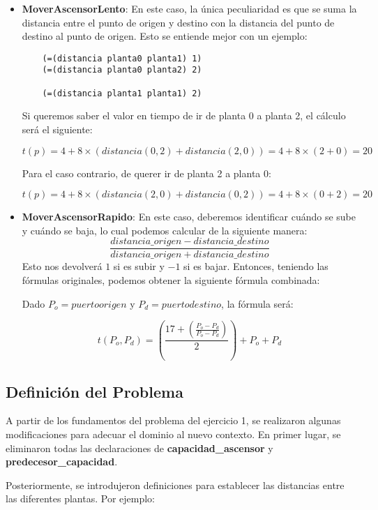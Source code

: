 \documentclass{article}
\begin{document}
 \begin{itemize}
    \item \textbf{MoverAscensorLento}: En este caso, la única peculiaridad es que se suma la distancia entre el punto de origen y destino con la distancia del 
    punto de destino al punto de origen. Esto se entiende mejor con un ejemplo:

    \begin{verbatim}
    (=(distancia planta0 planta1) 1)
    (=(distancia planta0 planta2) 2)

    (=(distancia planta1 planta1) 2)
    \end{verbatim}

    Si queremos saber el valor en tiempo de ir de planta 0 a planta 2, el cálculo será el siguiente:

    \[
    t(p) = 4 + 8 \times (distancia(0, 2) + distancia(2, 0)) = 4 + 8 \times (2 + 0) = 20
    \]

    Para el caso contrario, de querer ir de planta 2 a planta 0:

    \[
    t(p) = 4 + 8 \times (distancia(2, 0) + distancia(0, 2)) = 4 + 8 \times (0 + 2) = 20
    \]

    \item \textbf{MoverAscensorRapido}: En este caso, deberemos identificar cuándo se sube y cuándo se baja, lo cual podemos calcular de la siguiente manera:
    \[
    \frac{distancia\_origen - distancia\_destino}{distancia\_origen + distancia\_destino}
    \]
    Esto nos devolverá \(1\) si es subir y \(-1\) si es bajar. Entonces, teniendo las fórmulas originales, podemos obtener la siguiente fórmula combinada:

    Dado \(P_o = puerto origen\) y \(P_d = puerto destino\), la fórmula será:

    \[
    t(P_o,P_d) = \left(\frac{17 + \left(\frac{P_o - P_d}{P_o - P_d}\right)}{2}\right) + P_o + P_d
    \]
\end{itemize}

\subsection{Definición del Problema}

A partir de los fundamentos del problema del ejercicio 1, se realizaron algunas 
modificaciones para adecuar el dominio al nuevo contexto. En primer lugar, se 
eliminaron todas las declaraciones de \textbf{capacidad\_ascensor} y 
\textbf{predecesor\_capacidad}.

Posteriormente, se introdujeron definiciones para establecer las distancias entre las diferentes plantas. Por ejemplo:
\end{document}
